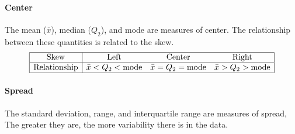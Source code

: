 \documentclass[../AP_Statistics.tex]{subfiles}
\begin{document}
				\paragraph{Center}
					The mean ($\bar{x}$), median ($Q_2$), and mode are measures of center. The relationship between these quantities is related to the skew.
					$$\begin{array}{|c|ccc|}\hline
						\rm{Skew} & \rm{Left} & \rm{Center} & \rm{Right} \\\hline
						\rm{Relationship} & \bar{x} < Q_2 < \rm{mode} & \bar{x} = Q_2 = \rm{mode} & \bar{x} > Q_2 > \rm{mode} \\\hline
					\end{array}$$
				\paragraph{Spread}
					The standard deviation, range, and interquartile range are measures of spread, The greater they are, the more variability there is in the data.
\end{document}
